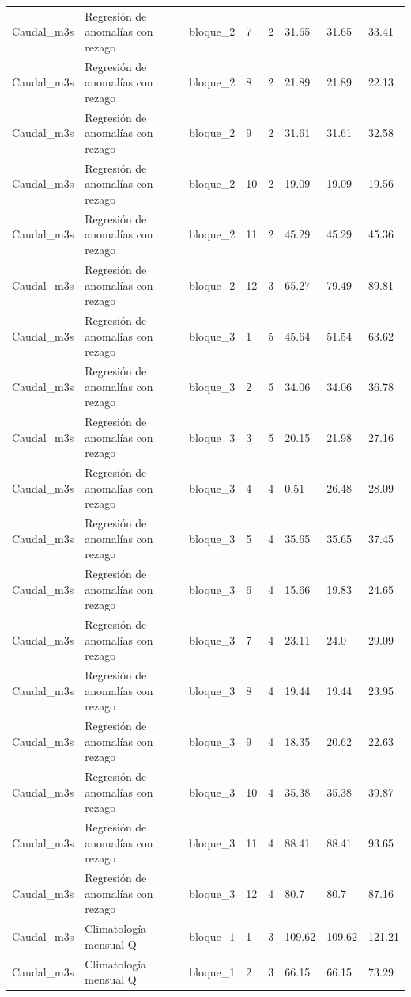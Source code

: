 \begin{longtable}{llllllll}
Caudal\_m3s & Regresión de anomalías con rezago & bloque\_2 & 7 & 2 & 31.65 & 31.65 & 33.41 \\
Caudal\_m3s & Regresión de anomalías con rezago & bloque\_2 & 8 & 2 & 21.89 & 21.89 & 22.13 \\
Caudal\_m3s & Regresión de anomalías con rezago & bloque\_2 & 9 & 2 & 31.61 & 31.61 & 32.58 \\
Caudal\_m3s & Regresión de anomalías con rezago & bloque\_2 & 10 & 2 & 19.09 & 19.09 & 19.56 \\
Caudal\_m3s & Regresión de anomalías con rezago & bloque\_2 & 11 & 2 & 45.29 & 45.29 & 45.36 \\
Caudal\_m3s & Regresión de anomalías con rezago & bloque\_2 & 12 & 3 & 65.27 & 79.49 & 89.81 \\
Caudal\_m3s & Regresión de anomalías con rezago & bloque\_3 & 1 & 5 & 45.64 & 51.54 & 63.62 \\
Caudal\_m3s & Regresión de anomalías con rezago & bloque\_3 & 2 & 5 & 34.06 & 34.06 & 36.78 \\
Caudal\_m3s & Regresión de anomalías con rezago & bloque\_3 & 3 & 5 & 20.15 & 21.98 & 27.16 \\
Caudal\_m3s & Regresión de anomalías con rezago & bloque\_3 & 4 & 4 & 0.51 & 26.48 & 28.09 \\
Caudal\_m3s & Regresión de anomalías con rezago & bloque\_3 & 5 & 4 & 35.65 & 35.65 & 37.45 \\
Caudal\_m3s & Regresión de anomalías con rezago & bloque\_3 & 6 & 4 & 15.66 & 19.83 & 24.65 \\
Caudal\_m3s & Regresión de anomalías con rezago & bloque\_3 & 7 & 4 & 23.11 & 24.0 & 29.09 \\
Caudal\_m3s & Regresión de anomalías con rezago & bloque\_3 & 8 & 4 & 19.44 & 19.44 & 23.95 \\
Caudal\_m3s & Regresión de anomalías con rezago & bloque\_3 & 9 & 4 & 18.35 & 20.62 & 22.63 \\
Caudal\_m3s & Regresión de anomalías con rezago & bloque\_3 & 10 & 4 & 35.38 & 35.38 & 39.87 \\
Caudal\_m3s & Regresión de anomalías con rezago & bloque\_3 & 11 & 4 & 88.41 & 88.41 & 93.65 \\
Caudal\_m3s & Regresión de anomalías con rezago & bloque\_3 & 12 & 4 & 80.7 & 80.7 & 87.16 \\
Caudal\_m3s & Climatología mensual Q & bloque\_1 & 1 & 3 & 109.62 & 109.62 & 121.21 \\
Caudal\_m3s & Climatología mensual Q & bloque\_1 & 2 & 3 & 66.15 & 66.15 & 73.29 \\

\end{longtable}
